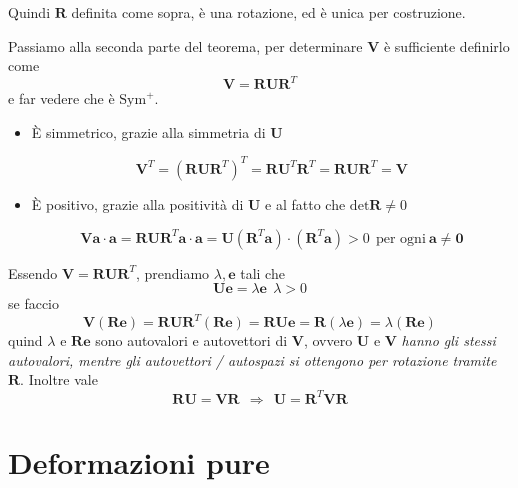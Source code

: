 \documentclass[10pt,a4paper,twoside]{book}
\begin{document}
Quindi $\mathbf{R}$ definita come sopra, è una rotazione, ed è unica per costruzione.

Passiamo alla seconda parte del teorema, per determinare $\mathbf{V}$ è sufficiente definirlo come
\begin{equation*}
\boxed{\mathbf{V} =\mathbf{RUR}^{T}}
\end{equation*}
e far vedere che è $\mathrm{Sym}^{+}$.
\begin{itemize}
\item È simmetrico, grazie alla simmetria di $\mathbf{U}$

\begin{equation*}
\mathbf{V}^{T} =\left(\mathbf{RUR}^{T}\right)^{T} =\mathbf{RU}^{T}\mathbf{R}^{T} =\mathbf{RUR}^{T} =\mathbf{V}
\end{equation*}
\item È positivo, grazie alla positività di $\mathbf{U}$ e al fatto che $\mathrm{det}\mathbf{R} \neq 0$

\begin{equation*}
\mathbf{Va} \cdot \mathbf{a} =\mathbf{RUR}^{T}\mathbf{a} \cdot \mathbf{a} =\mathbf{U}\left(\mathbf{R}^{T}\mathbf{a}\right) \cdot \left(\mathbf{R}^{T}\mathbf{a}\right)  >0\ \ \text{per ogni} \ \mathbf{a} \neq \mathbf{0}
\end{equation*}
\end{itemize}
\begin{oss}
Essendo $\mathbf{V} =\mathbf{RUR}^{T}$, prendiamo $\lambda ,\mathbf{e}$ tali che
\begin{equation*}
\mathbf{Ue} =\lambda \mathbf{e} \ \ \lambda  >0
\end{equation*}
se faccio
\begin{equation*}
\mathbf{V}(\mathbf{Re}) =\mathbf{RUR}^{T}(\mathbf{Re}) =\mathbf{RUe} =\mathbf{R}( \lambda \mathbf{e}) =\lambda (\mathbf{Re})
\end{equation*}
quind $\lambda $ e $\mathbf{Re}$ sono autovalori e autovettori di $\mathbf{V}$, ovvero $\mathbf{U}$ e $\mathbf{V}$ \emph{hanno gli stessi autovalori, mentre gli autovettori / autospazi si ottengono per rotazione tramite} $\mathbf{R}$. Inoltre vale
\begin{equation*}
\mathbf{RU} =\mathbf{VR} \ \ \Rightarrow \ \ \mathbf{U} =\mathbf{R}^{T}\mathbf{VR}
\end{equation*}
\end{oss}
\section{Deformazioni pure}
\end{document}
